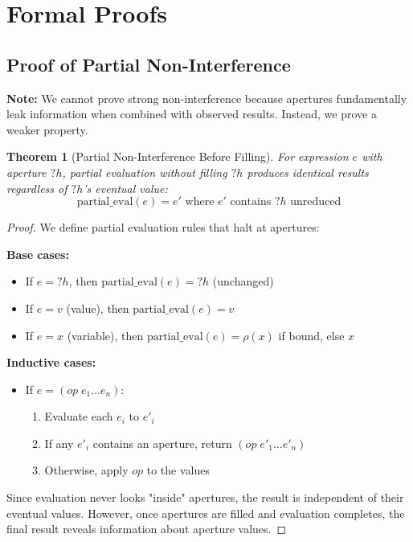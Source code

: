 \documentclass[12pt]{article}
\newtheorem{theorem}{Theorem}
\begin{document}



\appendix

\section{Formal Proofs}

\subsection{Proof of Partial Non-Interference}

\textbf{Note:} We cannot prove strong non-interference because apertures fundamentally leak information when combined with observed results. Instead, we prove a weaker property.

\begin{theorem}[Partial Non-Interference Before Filling]
For expression $e$ with aperture $?h$, partial evaluation without filling $?h$ produces identical results regardless of $?h$'s eventual value:
$$\text{partial\_eval}(e) = e' \text{ where } e' \text{ contains } ?h \text{ unreduced}$$
\end{theorem}

\begin{proof}
We define partial evaluation rules that halt at apertures:

\textbf{Base cases:}
\begin{itemize}
    \item If $e = ?h$, then $\text{partial\_eval}(e) = ?h$ (unchanged)
    \item If $e = v$ (value), then $\text{partial\_eval}(e) = v$
    \item If $e = x$ (variable), then $\text{partial\_eval}(e) = \rho(x)$ if bound, else $x$
\end{itemize}

\textbf{Inductive cases:}
\begin{itemize}
    \item If $e = (op \; e_1 \ldots e_n)$:
    \begin{enumerate}
        \item Evaluate each $e_i$ to $e'_i$ 
        \item If any $e'_i$ contains an aperture, return $(op \; e'_1 \ldots e'_n)$
        \item Otherwise, apply $op$ to the values
    \end{enumerate}
\end{itemize}

Since evaluation never looks "inside" apertures, the result is independent of their eventual values. However, once apertures are filled and evaluation completes, the final result reveals information about aperture values.
\end{proof}
\end{document}
